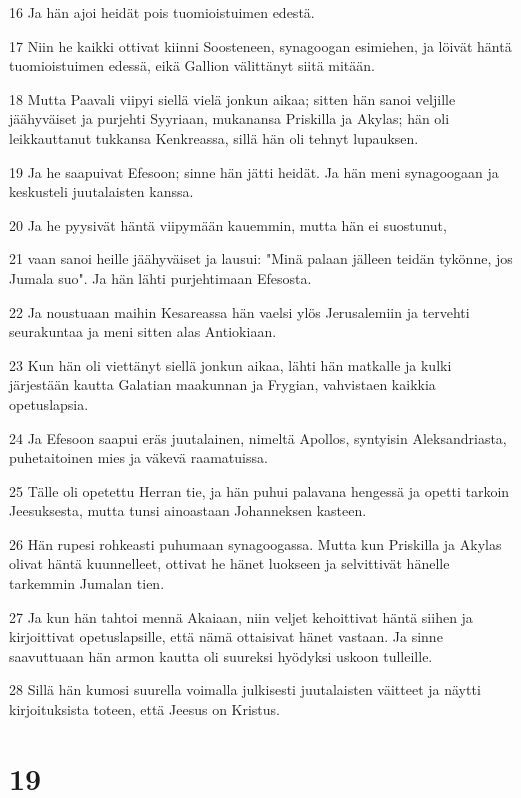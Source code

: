 \par 16 Ja hän ajoi heidät pois tuomioistuimen edestä.
\par 17 Niin he kaikki ottivat kiinni Soosteneen, synagoogan esimiehen, ja löivät häntä tuomioistuimen edessä, eikä Gallion välittänyt siitä mitään.
\par 18 Mutta Paavali viipyi siellä vielä jonkun aikaa; sitten hän sanoi veljille jäähyväiset ja purjehti Syyriaan, mukanansa Priskilla ja Akylas; hän oli leikkauttanut tukkansa Kenkreassa, sillä hän oli tehnyt lupauksen.
\par 19 Ja he saapuivat Efesoon; sinne hän jätti heidät. Ja hän meni synagoogaan ja keskusteli juutalaisten kanssa.
\par 20 Ja he pyysivät häntä viipymään kauemmin, mutta hän ei suostunut,
\par 21 vaan sanoi heille jäähyväiset ja lausui: "Minä palaan jälleen teidän tykönne, jos Jumala suo". Ja hän lähti purjehtimaan Efesosta.
\par 22 Ja noustuaan maihin Kesareassa hän vaelsi ylös Jerusalemiin ja tervehti seurakuntaa ja meni sitten alas Antiokiaan.
\par 23 Kun hän oli viettänyt siellä jonkun aikaa, lähti hän matkalle ja kulki järjestään kautta Galatian maakunnan ja Frygian, vahvistaen kaikkia opetuslapsia.
\par 24 Ja Efesoon saapui eräs juutalainen, nimeltä Apollos, syntyisin Aleksandriasta, puhetaitoinen mies ja väkevä raamatuissa.
\par 25 Tälle oli opetettu Herran tie, ja hän puhui palavana hengessä ja opetti tarkoin Jeesuksesta, mutta tunsi ainoastaan Johanneksen kasteen.
\par 26 Hän rupesi rohkeasti puhumaan synagoogassa. Mutta kun Priskilla ja Akylas olivat häntä kuunnelleet, ottivat he hänet luokseen ja selvittivät hänelle tarkemmin Jumalan tien.
\par 27 Ja kun hän tahtoi mennä Akaiaan, niin veljet kehoittivat häntä siihen ja kirjoittivat opetuslapsille, että nämä ottaisivat hänet vastaan. Ja sinne saavuttuaan hän armon kautta oli suureksi hyödyksi uskoon tulleille.
\par 28 Sillä hän kumosi suurella voimalla julkisesti juutalaisten väitteet ja näytti kirjoituksista toteen, että Jeesus on Kristus.

\chapter{19}

